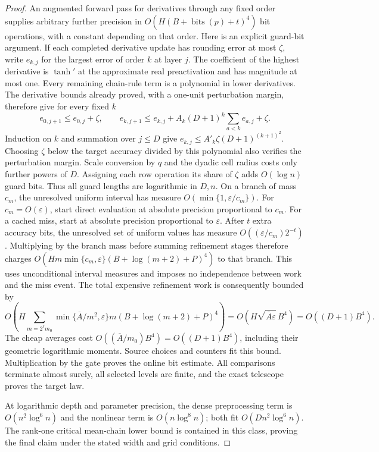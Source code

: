 \begin{proof}
An augmented forward pass for derivatives through any fixed order
supplies arbitrary further precision in
$O(H(B+\operatorname{bits}(p)+t)^4)$ bit operations, with a constant
depending on that order. Here is an explicit guard-bit argument.
If each completed derivative update has rounding error at most $\zeta$,
write $e_{k,j}$ for the largest error of order $k$ at layer $j$.
The coefficient of the highest derivative is $\tanh'$ at the
approximate real preactivation and has magnitude at most one.
Every remaining chain-rule term is a polynomial in lower derivatives.
The derivative bounds already proved, with a one-unit perturbation
margin, therefore give for every fixed $k$
\[
 e_{0,j+1}\le e_{0,j}+\zeta,\qquad
 e_{k,j+1}\le e_{k,j}
   +A_k(D+1)^k\sum_{a<k}e_{a,j}+\zeta.
\]
Induction on $k$ and summation over $j\le D$ give
$e_{k,j}\le A'_k\zeta(D+1)^{(k+1)^2}$.
Choosing $\zeta$ below the target accuracy divided by this polynomial
also verifies the perturbation margin. Scale conversion by $q$ and
the dyadic cell radius costs only further powers of $D$.
Assigning each row operation its share of $\zeta$ adds $O(\log n)$
guard bits. Thus all guard lengths are logarithmic in $D,n$.
On a branch of mass $c_m$, the unresolved uniform interval has measure
$O(\min\{1,\varepsilon/c_m\})$. For $c_m=O(\varepsilon)$,
start direct evaluation at absolute precision proportional to $c_m$.
For a cached miss, start at absolute precision proportional to
$\varepsilon$. After $t$ extra accuracy bits, the unresolved set of
uniform values has measure $O((\varepsilon/c_m)2^{-t})$.
Multiplying by the branch mass before summing refinement stages
therefore charges $O(Hm\min\{c_m,\varepsilon\}
(B+\log(m+2)+P)^4)$ to that branch. This uses unconditional interval
measures and imposes no independence between work and the miss event.
The total expensive refinement work is consequently bounded by
\[
 O\!\left(
 H\sum_{m=2^\ell m_0}
    \min\{\overline A/m^2,\varepsilon\}
       m(B+\log(m+2)+P)^4\right)
 =O\!\left(H\sqrt{\overline A\varepsilon}\,B^4\right)
 =O((D+1)B^4).
\]
The cheap averages cost
$O((\overline A/m_0)B^4)=O((D+1)B^4)$, including their
geometric logarithmic moments. Source choices and counters fit this
bound. Multiplication by the gate proves the online bit estimate.
All comparisons terminate almost surely, all selected levels are
finite, and the exact telescope proves the target law.

At logarithmic depth and parameter precision, the dense preprocessing
term is $O(n^2\log^6n)$ and the nonlinear term is
$O(n\log^8n)$; both fit $O(Dn^2\log^6n)$. The rank-one critical
mean-chain lower bound is contained in this class, proving the final
claim under the stated width and grid conditions.
\end{proof}

